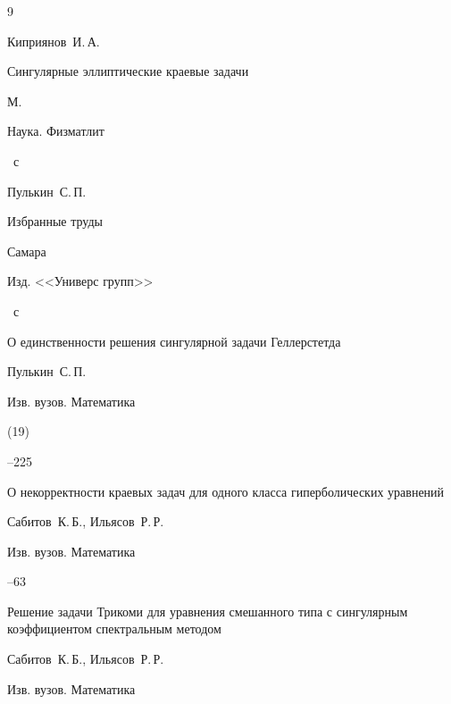 \begin{thebibliography}{9}




\by Киприянов~И.\,А.

\book Сингулярные эллиптические краевые задачи

\publaddr М.

\publ Наука. Физматлит


~с




\by Пулькин~С.\,П.

\book Избранные труды

\publaddr Самара

\publ Изд. <<Универс групп>>


~с




\paper О единственности решения сингулярной задачи Геллерстетда

\by Пулькин~С.\,П.

\jour Изв. вузов. Математика


(19)

--225




\paper О некорректности краевых задач для одного класса гиперболических уравнений

\by Сабитов~К.\,Б., Ильясов~Р.\,Р.

\jour Изв. вузов. Математика



--63




\paper Решение задачи Трикоми для уравнения смешанного типа с сингулярным коэффициентом спектральным методом

\by Сабитов~К.\,Б., Ильясов~Р.\,Р.

\jour Изв. вузов. Математика




\end{thebibliography}
